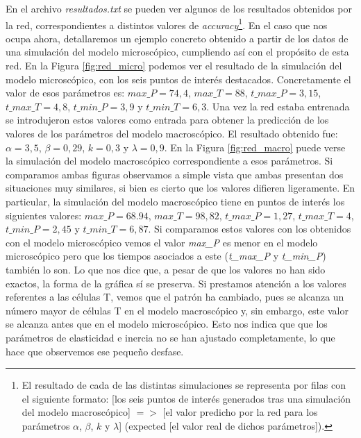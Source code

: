 

En el archivo \textit{resultados.txt} se pueden ver algunos de los resultados obtenidos por la red, correspondientes a distintos valores de \textit{accuracy}\footnote{El resultado de cada de las distintas simulaciones se representa por filas con el siguiente formato: [los seis puntos de interés generados tras una simulación del modelo macroscópico] $=>$ [el valor predicho por la red para los parámetros $\alpha$, $\beta$, $k$ y $\lambda$] (expected [el valor real de dichos parámetros]).}. En el caso que nos ocupa ahora, detallaremos un ejemplo concreto obtenido a partir de los datos de una simulación del modelo microscópico, cumpliendo así con el propósito de esta red. En la Figura \ref{fig:red_micro} podemos ver el resultado de la simulación del modelo microscópico, con los seis puntos de interés destacados. Concretamente el valor de esos parámetros es: $\textit{max\_P} = 74,4$, $\textit{max\_T} = 88$, $\textit{t\_max\_P} = 3,15$, $\textit{t\_max\_T} = 4,8$, $\textit{t\_min\_P} = 3,9$ y $\textit{t\_min\_T} = 6,3$. Una vez la red estaba entrenada se introdujeron estos valores como entrada para obtener la predicción de los valores de los parámetros del modelo macroscópico. El resultado obtenido fue: $\alpha = 3,5$, $\beta = 0,29$, $k = 0,3$ y $\lambda = 0,9$. En la Figura \ref{fig:red_macro} puede verse la simulación del modelo macroscópico correspondiente a esos parámetros. Si comparamos ambas figuras observamos a simple vista que ambas presentan dos situaciones muy similares, si bien es cierto que los valores difieren ligeramente. En particular, la simulación del modelo macroscópico tiene en puntos de interés los siguientes valores: $\textit{max\_P} = 68.94$, $\textit{max\_T} = 98,82$, $\textit{t\_max\_P} = 1,27$, $\textit{t\_max\_T} =4$, $\textit{t\_min\_P} = 2,45$ y $\textit{t\_min\_T} = 6,87$. Si comparamos estos valores con los obtenidos con el modelo microscópico vemos el valor \textit{max\_P} es menor en el modelo microscópico pero que los tiempos asociados a este (\textit{t\_max\_P} y \textit{t\_min\_P}) también lo son. Lo que nos dice que, a pesar de que los valores no han sido exactos, la forma de la gráfica sí se preserva. Si prestamos atención a los valores referentes a las células T, vemos que el patrón ha cambiado, pues se alcanza un número mayor de células T en el modelo macroscópico y, sin embargo, este valor se alcanza antes que en el modelo microscópico. Esto nos indica que que los parámetros de elasticidad e inercia no se han ajustado completamente, lo que hace que observemos ese pequeño desfase.



